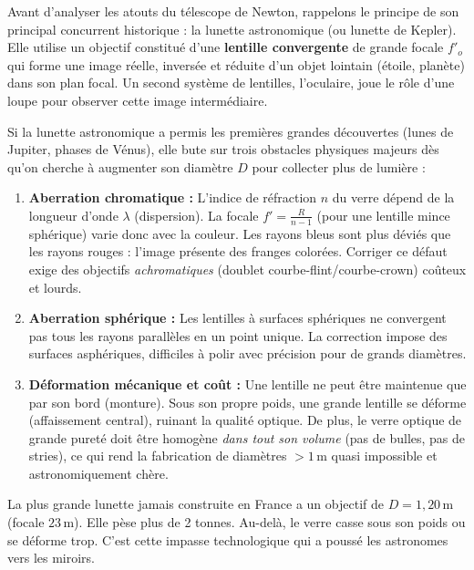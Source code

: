 \documentclass[11pt]{article}
\newcommand{\cle}[1]{{\popxbold\color{popdark}#1}}
\begin{document}
Avant d'analyser les atouts du télescope de Newton, rappelons le principe de son principal concurrent historique : la \cle{lunette astronomique} (ou lunette de Kepler). Elle utilise un \cle{objectif} constitué d'une \textbf{lentille convergente} de grande focale $f'_o$ qui forme une image réelle, inversée et réduite d'un objet lointain (étoile, planète) dans son plan focal. Un second système de lentilles, l'\cle{oculaire}, joue le rôle d'une loupe pour observer cette image intermédiaire.

\begin{attention}
Si la lunette astronomique a permis les premières grandes découvertes (lunes de Jupiter, phases de Vénus), elle bute sur trois obstacles physiques majeurs dès qu'on cherche à augmenter son diamètre $D$ pour collecter plus de lumière :
\begin{enumerate}
    \item \textbf{Aberration chromatique :} L'indice de réfraction $n$ du verre dépend de la longueur d'onde $\lambda$ (dispersion). La focale $f' = \frac{R}{n-1}$ (pour une lentille mince sphérique) varie donc avec la couleur. Les rayons bleus sont plus déviés que les rayons rouges : l'image présente des franges colorées. Corriger ce défaut exige des objectifs \emph{achromatiques} (doublet courbe-flint/courbe-crown) coûteux et lourds.
    \item \textbf{Aberration sphérique :} Les lentilles à surfaces sphériques ne convergent pas tous les rayons parallèles en un point unique. La correction impose des surfaces asphériques, difficiles à polir avec précision pour de grands diamètres.
    \item \textbf{Déformation mécanique et coût :} Une lentille ne peut être maintenue que par son bord (monture). Sous son propre poids, une grande lentille se déforme (affaissement central), ruinant la qualité optique. De plus, le verre optique de grande pureté doit être homogène \emph{dans tout son volume} (pas de bulles, pas de stries), ce qui rend la fabrication de diamètres $> 1\,\text{m}$ quasi impossible et astronomiquement chère.
\end{enumerate}
\end{attention}

\begin{savaistu}
La plus grande lunette jamais construite en France a un objectif de $D = 1,20\,\text{m}$ (focale $23\,\text{m}$). Elle pèse plus de 2 tonnes. Au-delà, le verre casse sous son poids ou se déforme trop. C'est cette impasse technologique qui a poussé les astronomes vers les miroirs.
\end{savaistu}
\end{document}

